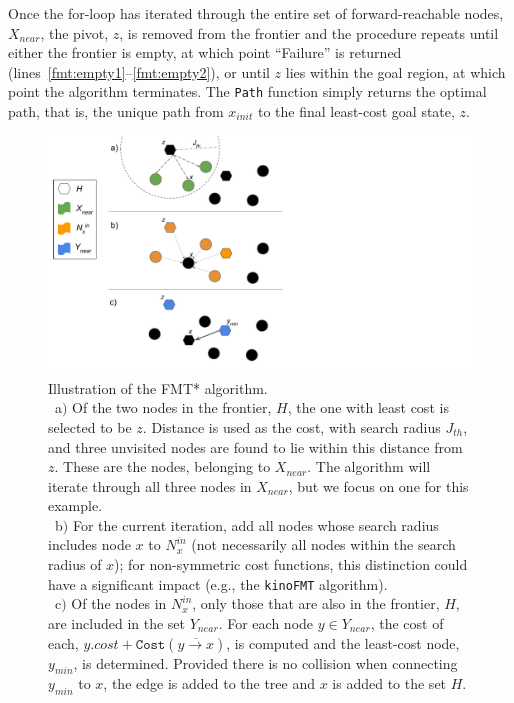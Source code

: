 Once the for-loop has iterated through the entire set of forward-reachable nodes, $X_{near}$, the pivot, $z$, is removed from the frontier and the procedure repeats until either the frontier is empty, at which point ``Failure'' is returned ({lines~\ref{fmt:empty1}--\ref{fmt:empty2}}), or until $z$ lies within the goal region, at which point the algorithm terminates. 
The \texttt{Path} function simply returns the optimal path, that is, the unique path from $x_{init}$ to the final least-cost goal state, $z$. 


\begin{figure}
    \centering
    \includegraphics[scale=0.89]{./figures/fmt_diagram}
    \caption[FMT* Diagram]{Illustration of the FMT* algorithm.\\
    \ a$\rparen$ Of the two nodes in the frontier, $H$, the one with least cost is selected to be $z$. Distance is used as the cost, with search radius $J_{th}$, and three unvisited nodes are found to lie within this distance from $z$. These are the nodes, belonging to $X_{near}$. The algorithm will iterate through all three nodes in $X_{near}$, but we focus on one for this example.\\
    \ b$\rparen$ For the current iteration, add all nodes whose search radius includes node $x$ to $N_x^{in}$ (not necessarily all nodes within the search radius of $x$); for non-symmetric cost functions, this distinction could have a significant impact (e.g., the \texttt{kinoFMT} algorithm).\\
    \ c$\rparen$ Of the nodes in $N_x^{in}$, only those that are also in the frontier, $H$, are included in the set $Y_{near}$. For each node $y \in Y_{near}$, the cost of each, $y.cost + \texttt{Cost}(\overline{y \to x})$, is computed and the least-cost node, $y_{min}$, is determined. Provided there is no collision when connecting $y_{min}$ to $x$, the edge is added to the tree and $x$ is added to the set $H$.
    }
\label{fig:fmt_diagram}
\end{figure}
